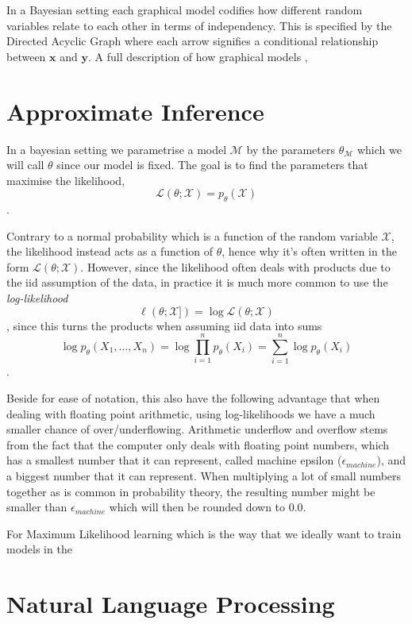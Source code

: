 In a Bayesian setting each graphical model codifies how different random variables relate
to each other in terms of independency. This is specified by the Directed
Acyclic Graph where each arrow signifies a conditional relationship between
$\bm{x}$ and $\bm{y}$. A full description of how graphical models ,

\section{Approximate Inference}

In a bayesian setting we parametrise a model $\mathcal{M}$ by the parameters
$\theta_{\mathcal{M}}$ which we will call $\theta$ since our model is fixed. The
goal is to find the parameters that maximise the likelihood,
\begin{equation}
  \label{eq:likelihood}
  \mathcal{L}(\theta; \mathcal{X}) = p_{\theta}(\mathcal{X})
\end{equation}.

Contrary to a normal probability which is a function of the random variable
$\mathcal{X}$, the likelihood instead acts as a function of $\theta$, hence why
it's often written in the form $\mathcal{L}(\theta; \mathcal{X})$. However,
since the likelihood often deals with products due to the iid assumption of the
data, in practice it is much more common to use the \textit{log-likelihood}
\begin{equation}
  \label{eq:log_likelihood}
  \ell(\theta; \mathcal{X]}) = \log \mathcal{L}(\theta; \mathcal{X})
\end{equation},
since this turns the products when assuming iid data into sums
\begin{equation*}
  \log p_{\theta}(X_1, \dots, X_n) = \log \prod_{i = 1}^n p_{\theta}(X_i) = \sum_{i = 1}^n \log p_{\theta}(X_i)
\end{equation*}.

Beside for ease of notation, this also have the following advantage that when
dealing with floating point arithmetic, using log-likelihoods we have a much
smaller chance of over/underflowing. Arithmetic underflow and overflow stems
from the fact that the computer only deals with floating point numbers, which
has a smallest number that it can represent, called machine epsilon
($\epsilon_{machine}$), and a biggest number that it can represent. When
multiplying a lot of small numbers together as is common in probability theory,
the resulting number might be smaller than $\epsilon_{machine}$ which will then
be rounded down to $0.0$.

For Maximum Likelihood learning which is the way that we ideally want to train
models in the

\section{Natural Language Processing}
